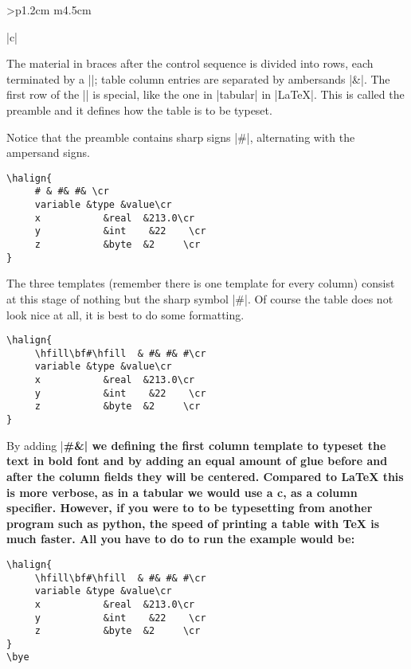 \begin{tabular}{>{\bfseries}p{1.2cm} m{4.5cm}}
\begin{tabular}[t]{|c|}
\begin{longtable}
The material in braces after the \cmd{\halign} control sequence is divided into rows, each terminated by a |\cr|; table column entries are separated by ambersands |&|. The first row of the |\halign| is special, like the one in |tabular| in |LaTeX|.
This is called the preamble and it defines how the table is to be typeset. 

Notice that the preamble contains sharp signs |#|, alternating with the ampersand signs.

\begin{scriptexample}{}{}
\begin{verbatim}
\halign{
     # & #& #& \cr
     variable &type &value\cr
     x           &real  &213.0\cr 
     y           &int    &22    \cr
     z           &byte  &2     \cr
}
\end{verbatim}
\end{scriptexample}

The three templates (remember there is one template for every column) consist at this stage of nothing but the sharp symbol |#|. Of course the table does not look nice at all, it is best to do some formatting.

\begin{scriptexample}{}{}
\begin{verbatim}
\halign{
     \hfill\bf#\hfill  & #& #& #\cr
     variable &type &value\cr
     x           &real  &213.0\cr 
     y           &int    &22    \cr
     z           &byte  &2     \cr
}
\end{verbatim}
\end{scriptexample}

By adding |\hfil\bf#\hfill &| we defining the first column template to typeset the text in bold font and by adding an equal amount of glue before and after the column fields they will be centered. Compared to LaTeX this is more verbose, as in a tabular we would use a \textbf{c}, as a column specifier. However, if you were to to be typesetting from another program such as python, the speed of printing a table with TeX is much faster. All you have to do to run the example would be:

\begin{verbatim}
\halign{
     \hfill\bf#\hfill  & #& #& #\cr
     variable &type &value\cr
     x           &real  &213.0\cr 
     y           &int    &22    \cr
     z           &byte  &2     \cr
}
\bye
\end{verbatim}


\end{longtable}
\end{tabular}
\end{tabular}
